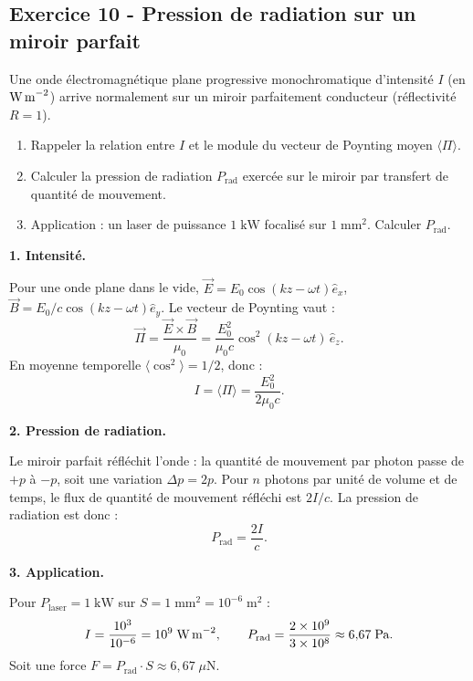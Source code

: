 \documentclass[12pt,a4paper]{article}
\begin{document}
\subsection*{Exercice 10 - Pression de radiation sur un miroir parfait \niveau{\moyen}}

\begin{boiteexercice}
Une onde électromagnétique plane progressive monochromatique d'intensité $I$ (en $\text{W\,m}^{-2}$) arrive normalement sur un miroir parfaitement conducteur (réflectivité $R=1$).
\begin{enumerate}
  \item Rappeler la relation entre $I$ et le module du vecteur de Poynting moyen $\langle\Pi\rangle$.
  \item Calculer la pression de radiation $P_\text{rad}$ exercée sur le miroir par transfert de quantité de mouvement.
  \item Application : un laser de puissance $1\;\text{kW}$ focalisé sur $1\;\text{mm}^2$. Calculer $P_\text{rad}$.
\end{enumerate}
\end{boiteexercice}

\begin{boitecorrige}

\textbf{1. Intensité.}

Pour une onde plane dans le vide, $\vec{E} = E_0\cos(kz-\omega t)\hat{e}_x$, $\vec{B} = E_0/c\cos(kz-\omega t)\hat{e}_y$. Le vecteur de Poynting vaut :
\[
\vec{\Pi} = \frac{\vec{E}\times\vec{B}}{\mu_0} = \frac{E_0^2}{\mu_0 c}\cos^2(kz-\omega t)\,\hat{e}_z.
\]
En moyenne temporelle $\langle\cos^2\rangle = 1/2$, donc :
\[
I = \langle\Pi\rangle = \frac{E_0^2}{2\mu_0 c}.
\]

\textbf{2. Pression de radiation.}

Le miroir parfait réfléchit l'onde : la quantité de mouvement par photon passe de $+p$ à $-p$, soit une variation $\Delta p = 2p$. Pour $n$ photons par unité de volume et de temps, le flux de quantité de mouvement réfléchi est $2I/c$. La pression de radiation est donc :
\[
P_\text{rad} = \frac{2I}{c}.
\]

\textbf{3. Application.}

Pour $P_\text{laser} = 1\;\text{kW}$ sur $S = 1\;\text{mm}^2 = 10^{-6}\;\text{m}^2$ :
\[
I = \frac{10^3}{10^{-6}} = 10^9\;\text{W\,m}^{-2}, \qquad P_\text{rad} = \frac{2\times 10^9}{3\times 10^8} \approx 6{,}67\;\text{Pa}.
\]
Soit une force $F = P_\text{rad}\cdot S \approx 6{,}67\;\mu\text{N}$.

\end{boitecorrige}
\end{document}

